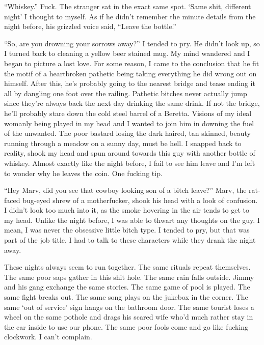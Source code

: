 ``Whiskey.'' Fuck. The stranger sat in the exact same
spot. `Same shit, different night' I thought to myself.
As if he didn't remember the minute details from the night
before, his grizzled voice said, ``Leave the
bottle.''



``So, are you drowning your sorrows away?'' I tended to
pry. He didn't look up, so I turned back to cleaning a yellow
beer stained mug. My mind wandered and I began to picture a lost
love. For some reason, I came to the conclusion that he fit the
motif of a heartbroken pathetic being taking everything he did
wrong out on himself. After this, he's probably going to the
nearest bridge and tease ending it all by dangling one foot over
the railing. Pathetic bitches never actually jump since
they're always back the next day drinking the same drink. If
not the bridge, he'll probably stare down the cold steel
barrel of a Beretta. Visions of my ideal womanly being played in my
head and I wanted to join him in downing the fuel of the unwanted.
The poor bastard losing the dark haired, tan skinned, beauty
running through a meadow on a sunny day, must be hell. I snapped
back to reality, shook my head and spun around towards this guy
with another bottle of whiskey. Almost exactly like the night
before, I fail to see him leave and I'm left to wonder why he
leaves the coin. One fucking tip.



``Hey Marv, did you see that cowboy looking son of a bitch
leave?'' Marv, the rat-faced bug-eyed shrew of a motherfucker,
shook his head with a look of confusion. I didn't look too
much into it, as the smoke hovering in the air tends to get to my
head. Unlike the night before, I was able to thwart any thoughts on
the guy. I mean, I was never the obsessive little bitch type. I
tended to pry, but that was part of the job title. I had to talk to
these characters while they drank the night away.



These nights always seem to run together. The same rituals repeat
themselves. The same poor saps gather in this shit hole. The same
rain falls outside. Jimmy and his gang exchange the same stories.
The same game of pool is played. The same fight breaks out. The
same song plays on the jukebox in the corner. The same `out
of service' sign hangs on the bathroom door. The same tourist
loses a wheel on the same pothole and drags his scared wife
who'd much rather stay in the car inside to use our phone.
The same poor fools come and go like fucking clockwork. I
can't complain.



